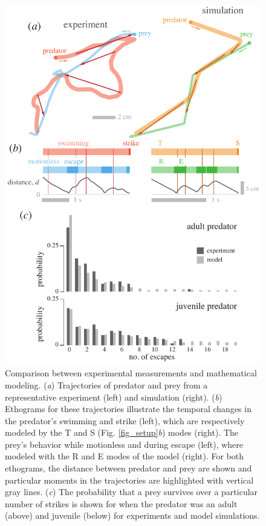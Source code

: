 \documentclass[]{rsos}%
\begin{document}
\pagebreak

\pagebreak

\begin{figure}[!h]
\centering
	\includegraphics[width=4.5in]{fig_trajectories}
\caption{Comparison between experimental measurements and mathematical modeling. 
(\textit{a}) Trajectories of predator and prey from a representative experiment (left) and simulation (right).
(\textit{b}) Ethograms for these trajectories illustrate the temporal changes in the predator's swimming and strike (left), which are respectively modeled by the T and S (Fig. \ref{fig_setup}\textit{b}) modes (right). 
The prey's behavior while motionless and during escape (left), where modeled with the R and E modes of the model (right).
For both ethograms, the distance between predator and prey are shown and particular moments in the trajectories are highlighted with vertical gray lines.
(\textit{c}) The probability that a prey survives over a particular number of strikes is shown for when the predator was an adult (above) and juvenile (below) for experiments and model simulations.   
}
\label{fig_traj}
\end{figure}
\end{document}
